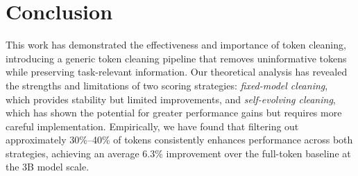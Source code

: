 \section{Conclusion}\label{sec:conclusion}


This work has demonstrated the effectiveness and importance of token cleaning, introducing a generic token cleaning pipeline that removes uninformative tokens while preserving task-relevant information.
Our theoretical analysis has revealed the strengths and limitations of two scoring strategies: \emph{fixed-model cleaning}, which provides stability but limited improvements, and \emph{self-evolving cleaning}, which has shown the potential for greater performance gains but requires more careful implementation.
Empirically, we have found that filtering out approximately 30\%–40\% of tokens consistently enhances performance across both strategies, achieving an average 6.3\% improvement over the full-token baseline at the 3B model scale.




